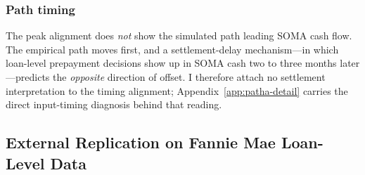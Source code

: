 \documentclass[12pt]{article}
\begin{document}
\subsubsection{Path timing}

The peak alignment does \emph{not} show the simulated path leading SOMA cash flow. The empirical path moves first, and a settlement-delay mechanism---in which loan-level prepayment decisions show up in SOMA cash two to three months later---predicts the \emph{opposite} direction of offset. I therefore attach no settlement interpretation to the timing alignment; Appendix~\ref{app:patha-detail} carries the direct input-timing diagnosis behind that reading.

\subsection{External Replication on Fannie Mae Loan-Level Data}\label{sec:pathb-fannie}
\end{document}

